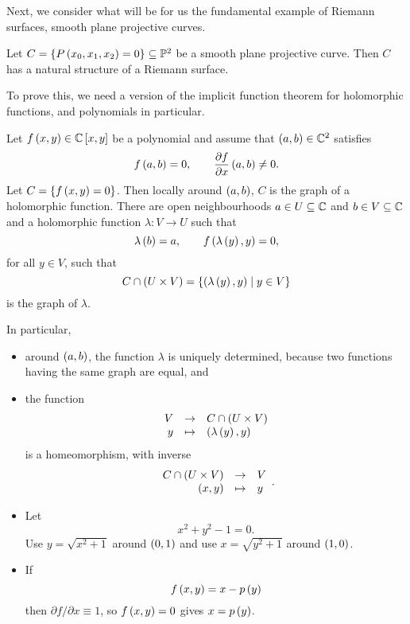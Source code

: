 \pagebreak

Next, we consider what will be for us the fundamental example of Riemann surfaces, smooth plane projective curves.

\begin{lemma}
\label{lem:15.5}
Let $ C = \left\{ P\left( x_0, x_1, x_2 \right) = 0 \right\} \subseteq \mathbb{P}^2 $ be a smooth plane projective curve. Then $ C $ has a natural structure of a Riemann surface.
\end{lemma}

To prove this, we need a version of the implicit function theorem for holomorphic functions, and polynomials in particular.

\begin{theorem}
Let $ f\left( x, y \right) \in \mathbb{C}\left[ x, y \right] $ be a polynomial and assume that $ \left( a, b \right) \in \mathbb{C}^2 $ satisfies
$$ f\left( a, b \right) = 0, \qquad \dfrac{\partial f}{\partial x}\left( a, b \right) \ne 0. $$
Let $ C = \left\{ f\left( x, y \right) = 0 \right\} $. Then locally around $ \left( a, b \right) $, $ C $ is the graph of a holomorphic function. There are open neighbourhoods $ a \in U \subseteq \mathbb{C} $ and $ b \in V \subseteq \mathbb{C} $ and a holomorphic function $ \lambda : V \to U $ such that
$$ \lambda\left( b \right) = a, \qquad f\left( \lambda\left( y \right), y \right) = 0, $$
for all $ y \in V $, such that
$$ C \cap \left( U \times V \right) = \left\{ \left( \lambda\left( y \right), y \right) \mid y \in V \right\} $$
is the graph of $ \lambda $.
\end{theorem}

\begin{note*}
In particular,
\begin{itemize}
\item around $ \left( a, b \right) $, the function $ \lambda $ is uniquely determined, because two functions having the same graph are equal, and
\item the function
$$ \function{V}{C \cap \rb{U \times V}}{y}{\rb{\lambda\rb{y}, y}} $$
is a homeomorphism, with inverse
$$ \function{C \cap \rb{U \times V}}{V}{\rb{x, y}}{y}. $$
\end{itemize}
\end{note*}

\begin{example*}
\hfill
\begin{itemize}
\item Let
$$ x^2 + y^2 - 1 = 0. $$
Use $ y = \sqrt{x^2 + 1} $ around $ \left( 0, 1 \right) $ and use $ x = \sqrt{y^2 + 1} $ around $ \left( 1, 0 \right) $.
\item If
$$ f\left( x, y \right) = x - p\left( y \right) $$
then $ \partial f / \partial x \equiv 1 $, so $ f\left( x, y \right) = 0 $ gives $ x = p\left( y \right) $.
\end{itemize}
\end{example*}

